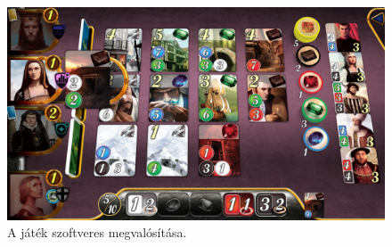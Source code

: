 \begin{figure}[h]
\centering
\includegraphics[scale=0.2]{images/digital_edition.jpg}
\caption{A játék szoftveres megvalósítása.}
\label{fig:digital}
\end{figure}
